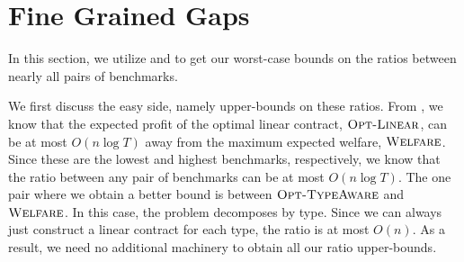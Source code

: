 \documentclass{article}
\newcommand{\OWelfare}{\textsc{Welfare}}
\newcommand{\OTypeAware}{\textsc{Opt-TypeAware}}
\newcommand{\OLinear}{\textsc{Opt-Linear}}
\begin{document}
 
 
  
  
  
\section{Fine Grained Gaps}
\label{sec:reductions}

In this section, we utilize  and  to get our worst-case bounds on the ratios between nearly all pairs of benchmarks.

We first discuss the easy side, namely upper-bounds on these ratios. From , we know that the expected profit of the optimal linear contract, $\OLinear$, can be at most $O(n \log T)$ away from the maximum expected welfare, $\OWelfare$. Since these are the lowest and highest benchmarks, respectively, we know that the ratio between any pair of benchmarks can be at most $O(n \log T)$. The one pair where we obtain a better bound is between $\OTypeAware$ and $\OWelfare$. In this case, the problem decomposes by type. Since we can always just construct a linear contract for each type, the ratio is at most $O(n)$. As a result, we need no additional machinery to obtain all our ratio upper-bounds.
\end{document}
